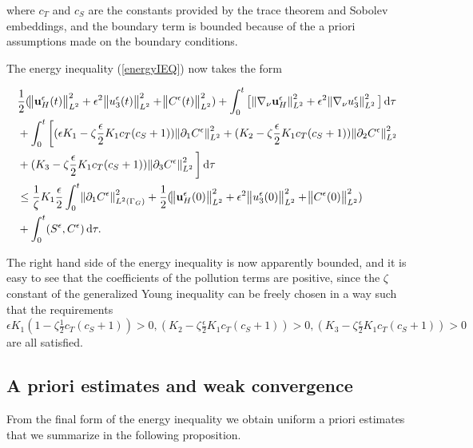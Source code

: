 \documentclass[11pt]{article}
\newcommand*\diff{\mathop{}\!\mathrm{d}}
\begin{document}
  where $c_T$ and $c_S$ are the constants provided by the trace theorem and Sobolev embeddings, and the boundary term is bounded because of the a priori assumptions made on the boundary conditions.
  
The energy inequality (\ref{energyIEQ}) now takes the form

  \begin{equation}
    \begin{split}  
    & \frac{1}{2} (\norm{\mathbf{u}_H^\epsilon (t)}_{L^2}^2 + \epsilon ^ 2 \norm{u_3^\epsilon (t)}_{L^2}^2 + \norm{C^\epsilon (t)}_{L^2}^2) + \int_0 ^ t \big [\norm{\nabla_\nu \mathbf{u}_H^\epsilon}_{L^2}^2 + \epsilon ^ 2 \norm{\nabla_\nu u_3^\epsilon}_{L^2}^2 \big ] \diff \tau \\
    & + \int_0 ^ t \bigg[ (\epsilon K_1 - \zeta \frac{\epsilon}{2} K_1 c_T (c_S + 1)) \norm{\partial_1 C^\epsilon}_{L^2}^2  + (K_2 - \zeta \frac{\epsilon}{2} K_1 c_T (c_S + 1)) \norm{\partial_2 C^\epsilon}_{L^2}^2 \\
    & + (K_3 - \zeta \frac{\epsilon}{2} K_1 c_T (c_S + 1)) \norm{\partial_3 C^\epsilon}_{L^2}^2 \bigg] \diff \tau \\
    & \leq \frac{1}{\zeta} K_1 \frac{\epsilon}{2} \int_0 ^ t \norm{\partial_1 C^\epsilon}^2 _{L^2 (\Gamma_G)} + \frac{1}{2} (\norm{\mathbf{u}_H^\epsilon (0)}_{L^2}^2 + \epsilon ^ 2 \norm{u_3^\epsilon (0)}_{L^2}^2 + \norm{C^\epsilon (0)}_{L^2}^2) \\
    & + \int_0^t (S^\epsilon,C^\epsilon) \diff \tau. \raisetag{20pt} \label{finalformEIEQ}
    \end{split}
  \end{equation}  
    
  The right hand side of the energy inequality is now apparently bounded, and it is easy to see that the coefficients of the pollution terms are positive, since the $\zeta$ constant of the generalized Young inequality can be freely chosen in a way such that the requirements $\epsilon K_1 (1 - \zeta \frac{1}{2} c_T (c_S + 1)) > 0, (K_2 - \zeta \frac{\epsilon}{2} K_1 c_T (c_S + 1)) > 0, (K_3 - \zeta \frac{\epsilon}{2} K_1 c_T (c_S + 1)) > 0 $ are all satisfied.
    
  \subsection{A priori estimates and weak convergence}
  
  From the final form of the energy inequality we obtain uniform a priori estimates that we summarize in the following proposition.
  
\end{document}
